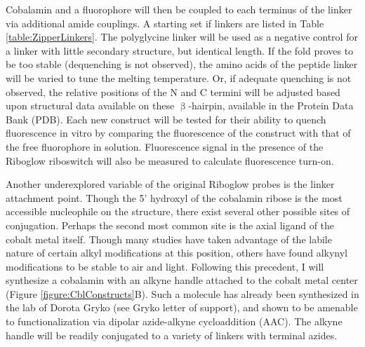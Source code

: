 Cobalamin and a fluorophore will then be coupled to each terminus of the linker via additional amide couplings\cite{JackowskaVitaminB12derivatives2018}.
A starting set if linkers are listed in Table \ref{table:ZipperLinkers}.
The polyglycine linker will be used as a negative control for a linker with little secondary structure, but identical length.
If the fold proves to be too stable (dequenching is not observed), the amino acids of the peptide linker will be varied to tune the melting temperature.
Or, if adequate quenching is not observed, the relative positions of the N and C termini will be adjusted based upon structural data available on these $\upbeta$-hairpin, available in the Protein Data Bank (PDB).
Each new construct will be tested for their ability to quench fluorescence in vitro by comparing the fluorescence of the construct with that of the free fluorophore in solution. Fluorescence signal in the presence of the Riboglow riboswitch will also be measured to calculate fluorescence turn-on.

Another underexplored variable of the original Riboglow probes is the linker attachment point.
Though the 5' hydroxyl of the cobalamin ribose is the most accessible nucleophile on the structure, there exist several other possible sites of conjugation.
Perhaps the second most common site is the axial ligand of the cobalt metal itself.
Though many studies have taken advantage of the labile nature of certain alkyl modifications at this position\cite{ShellVitaminB12Tunable2015}, others have found alkynyl modifications to be stable to air and light\cite{ChrominskiReductionfreesynthesisstable2013,RuetzMarkusPhenylethynylcobalaminLightStable2013}.
Following this precedent, I will synthesize a cobalamin with an alkyne handle attached to the cobalt metal center (Figure \ref{figure:CblConstructs}B).
Such a molecule has already been synthesized in the lab of Dorota Gryko (see Gryko letter of support), and shown to be amenable to functionalization via dipolar azide-alkyne cycloaddition (AAC)\cite{ChrominskiVitaminB12Derivatives2014}.
The alkyne handle will be readily conjugated to a variety of linkers with terminal azides\cite{KolbHartmuthC.ClickChemistryDiverse2001,PattersonFindingRightBioorthogonal2014}.

